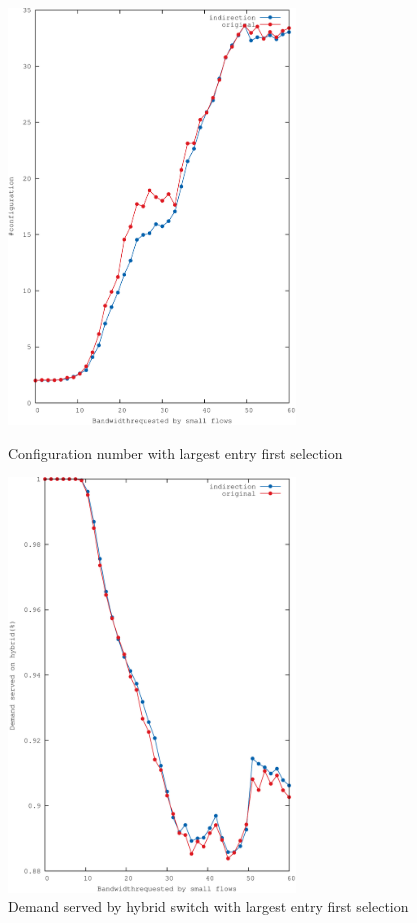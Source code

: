 \begin{figure}
	\centering
	\begin{minipage}{3in}%
		\includegraphics[width=3in]{figures/ndaySorted}
		\caption{Configuration number with largest entry first selection}
		\label{fig:ndaySorted}
	\end{minipage}%
	\qquad
	\begin{minipage}{3in}%
		\includegraphics[width=3in]{figures/ndem3Sorted}
		\caption{Demand served by hybrid switch with largest entry first selection}
		\label{fig:ndem3Sorted}
	\end{minipage}%
\end{figure}

